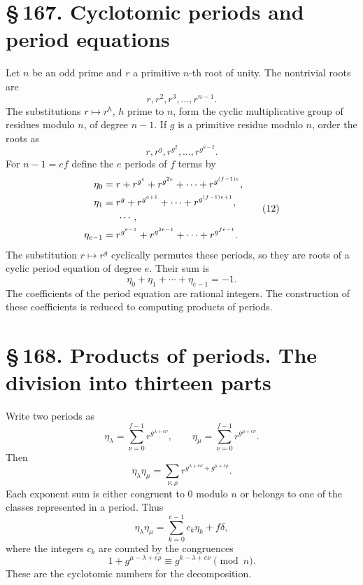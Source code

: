 \documentclass[11pt]{article}
\providecommand{\sect}[2]{\section*{\S\,#1. #2}}
\begin{document}
\sect{167}{Cyclotomic periods and period equations}

Let $n$ be an odd prime and $r$ a primitive $n$-th root of unity. The nontrivial roots are
\[
        r,r^2,r^3,
        \ldots,r^{n-1}.                                                \tag{1}
\]
The substitutions $r\mapsto r^h$, $h$ prime to $n$, form the cyclic multiplicative group of residues modulo $n$, of degree $n-1$. If $g$ is a primitive residue modulo $n$, order the roots as
\[
        r,r^g,r^{g^2},
        \ldots,r^{g^{n-2}}.                                            \tag{2}
\]
For $n-1=ef$ define the $e$ periods of $f$ terms by
\[
\begin{aligned}
\eta_0&=r+r^{g^e}+r^{g^{2e}}+
        \cdots+r^{g^{(f-1)e}},\\
\eta_1&=r^g+r^{g^{e+1}}+
        \cdots+r^{g^{(f-1)e+1}},\\
&\hspace{1.5em}\cdots,\\
\eta_{e-1}&=r^{g^{e-1}}+r^{g^{2e-1}}+
        \cdots+r^{g^{fe-1}}.
\end{aligned}                                                          \tag{12}
\]
The substitution $r\mapsto r^g$ cyclically permutes these periods, so they are roots of a cyclic period equation of degree $e$. Their sum is
\[
        \eta_0+
        \eta_1+
        \cdots+
        \eta_{e-1}=-1.                                                  \tag{13}
\]
The coefficients of the period equation are rational integers. The construction of these coefficients is reduced to computing products of periods.

\sect{168}{Products of periods. The division into thirteen parts}

Write two periods as
\[
        \eta_\lambda=
        \sum_{\nu=0}^{f-1} r^{g^{\lambda+e\nu}},
        \qquad
        \eta_\mu=
        \sum_{\nu=0}^{f-1} r^{g^{\mu+e\nu}} .                           \tag{1}
\]
Then
\[
        \eta_\lambda\eta_\mu=
        \sum_{\nu,\rho} r^{g^{\lambda+e\nu}+g^{\mu+e\rho}}.              \tag{2}
\]
Each exponent sum is either congruent to $0$ modulo $n$ or belongs to one of the classes represented in a period. Thus
\[
        \eta_\lambda\eta_\mu=
        \sum_{k=0}^{e-1} c_k\eta_k+f\delta,                             \tag{3}
\]
where the integers $c_k$ are counted by the congruences
\[
        1+g^{\mu-\lambda+e\rho}
        \equiv g^{k-
\lambda+e\nu}\pmod n.                               \tag{4}
\]
These are the cyclotomic numbers for the decomposition.
\end{document}
